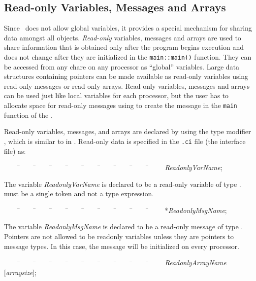 \subsection{Read-only Variables, Messages and Arrays}

Since \charmpp\ does not allow global variables, it provides a special
mechanism for sharing data amongst all objects. {\it Read-only}
variables, messages and arrays are used to share information that 
is obtained only after the program begins execution and does not
change after they are initialized in the {\tt main::main()} function. They
can be accessed from any chare on any processor as ``global''
variables. Large data structures containing pointers can be made
available as read-only variables using read-only messages or
read-only arrays. Read-only variables, messages and arrays can
be used just like local variables for each processor, but the user has
to allocate space for read-only messages using  to create
the message in the {\tt main} function of the . 

Read-only variables, messages, and arrays are declared by using the type
modifier , which is similar to  in
\CC. Read-only data is specified in the {\tt .ci} file (the interface
file) as: 

\begin{tabbing}
~~~~ \=~~~~ \=~~~~ \=~~~~ \=~~~~ \=~~~~ \=~~~~ \=~~~~ \=~~~~ \=~~~~ \kill
\>   {\it ReadonlyVarName};
\end{tabbing}

The variable {\it ReadonlyVarName} is declared to be a read-only
variable of type .  must be a single token and not a
type expression.

\begin{tabbing}
~~~~ \=~~~~ \=~~~~ \=~~~~ \=~~~~ \=~~~~ \=~~~~ \=~~~~ \=~~~~ \=~~~~ \kill
\>   *{\it ReadonlyMsgName};
\end{tabbing}

The variable {\it ReadonlyMsgName} is declared to be a read-only
message of type . Pointers are not allowed to be
readonly variables unless they are pointers to message types. In this
case, the message will be initialized on every processor.

\begin{tabbing}
~~~~ \=~~~~ \=~~~~ \=~~~~ \=~~~~ \=~~~~ \=~~~~ \=~~~~ \=~~~~ \=~~~~ \kill
\>   {\it ReadonlyArrayName} [{\it arraysize}];
\end{tabbing}

